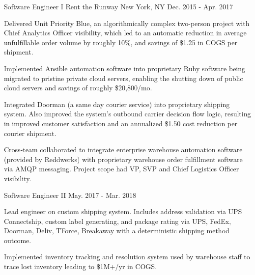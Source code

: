 
\begin{cventries}

  \cventry
    {Software Engineer I} %
    {Rent the Runway} %
    {New York, NY} %
    {Dec. 2015 - Apr. 2017} %
    {
      \begin{cvitems} %
        \item {Delivered Unit Priority Blue, an algorithmically complex two-person project with Chief Analytics Officer visibility, which led to an automatic reduction in average unfulfillable order volume by roughly 10\%, and savings of \$1.25 in COGS per shipment.}
        \item {Implemented Ansible automation software into proprietary Ruby software being migrated to pristine private cloud servers, enabling the shutting down of public cloud servers and savings of roughly \$20,800/mo.}
        \item {Integrated Doorman (a same day courier service) into proprietary shipping system. Also improved the system's outbound carrier decision flow logic, resulting in improved customer satisfaction and an annualized \$1.50 cost reduction per courier shipment.}
        \item {Cross-team collaborated to integrate enterprise warehouse automation software (provided by Reddwerks) with proprietary warehouse order fulfillment software via AMQP messaging. Project scope had VP, SVP and Chief Logistics Officer visibility.}
      \end{cvitems}
    }


  \cventry
    {Software Engineer II} %
    {} %
    {} %
    {May. 2017 - Mar. 2018} %
    {
      \begin{cvitems} %
        \item {Lead engineer on custom shipping system. Includes address validation via UPS Connectship, custom label generating, and package rating via UPS, FedEx, Doorman, Deliv, TForce, Breakaway with a deterministic shipping method outcome.} %
        \item {Implemented inventory tracking and resolution system used by warehouse staff to trace lost inventory leading to \$1M+/yr in COGS.} %
      \end{cvitems}
    }


\end{cventries}
